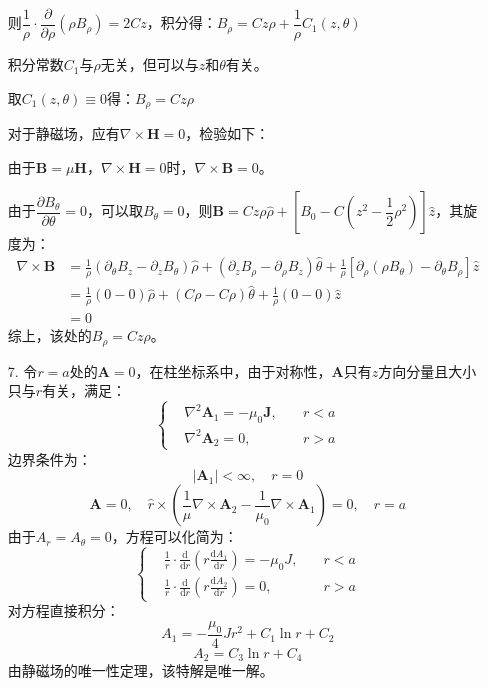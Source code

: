 \documentclass[a4paper,fontset=none]{ctexart}
\begin{document}
\begin{itemize}
    则$\dfrac{1}{\rho}\cdot\dfrac{\partial}{\partial\rho}(\rho B_\rho)=2Cz$，积分得：$B_\rho=Cz\rho+\dfrac{1}{\rho}C_1(z,\theta)$

    积分常数$C_1$与$\rho$无关，但可以与$z$和$\theta$有关。

    取$C_1(z,\theta)\equiv0$得：$B_\rho=Cz\rho$

    对于静磁场，应有$\nabla\times\bm{H}=0$，检验如下：

    由于$\bm{B}=\mu\bm{H}$，$\nabla\times\bm{H}=0$时，$\nabla\times\bm{B}=0$。

    由于$\dfrac{\partial B_\theta}{\partial\theta}=0$，可以取$B_\theta=0$，则$\bm{B}=Cz\rho\hat{\rho}+\left[B_0-C(z^2-\dfrac{1}{2}\rho^2)\right]\hat{z}$，其旋度为：
    \begin{align*}
    \nabla\times\bm{B}
    &= \frac{1}{\rho}(\partial_\theta B_z - \partial_z B_\theta)\hat{\rho} + (\partial_z B_\rho - \partial_\rho B_z)\hat{\theta} + \frac{1}{\rho}[\partial_\rho(\rho B_\theta) - \partial_\theta B_\rho]\hat{z} \\
    &= \frac{1}{\rho}(0 - 0)\hat{\rho} + (C\rho - C\rho)\hat{\theta} + \frac{1}{\rho}(0 - 0)\hat{z} \\
    &= 0
    \end{align*}
    综上，该处的$B_\rho=Cz\rho$。

    \item[7.]
    令$r=a$处的$\bm{A}=0$，在柱坐标系中，由于对称性，$\bm{A}$只有$z$方向分量且大小只与$r$有关，满足：
    \[
    \left\{
        \begin{aligned}
            &\nabla^2\bm{A}_1 = -\mu_0\bm{J},\quad &r<a \\
            &\nabla^2\bm{A}_2 = 0,\quad &r>a
        \end{aligned}
    \right.
    \]
    边界条件为：
    \[
    |\bm{A}_1|<\infty,\quad r=0
    \]
    \[
    \bm{A}=0,\quad \hat{r}\times\left(\frac{1}{\mu}\nabla\times\bm{A}_2 - \frac{1}{\mu_0}\nabla\times\bm{A}_1\right)=0,\quad r=a
    \]
    由于$A_r=A_\theta=0$，方程可以化简为：
    \[
    \left\{
        \begin{aligned}
            &\frac{1}{r}\cdot\frac{\mathrm{d}}{\mathrm{d}r}\left(r\frac{\mathrm{d}A_1}{\mathrm{d}r}\right) = -\mu_0 J,\quad &r<a \\
            &\frac{1}{r}\cdot\frac{\mathrm{d}}{\mathrm{d}r}\left(r\frac{\mathrm{d}A_2}{\mathrm{d}r}\right) = 0,\quad &r>a
        \end{aligned}
    \right.
    \]
    对方程直接积分：
    \[
    A_1 = -\frac{\mu_0}{4}Jr^2 + C_1\ln r + C_2
    \]
    \[
    A_2 = C_3\ln r + C_4
    \]
    由静磁场的唯一性定理，该特解是唯一解。


\end{itemize}
\end{document}
